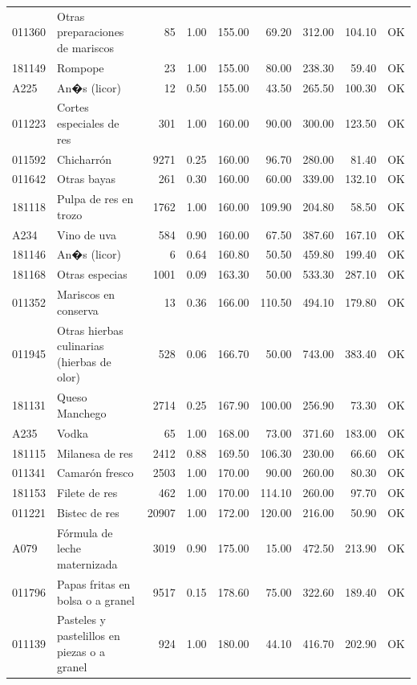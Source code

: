 \begin{table}[ht]
\begin{tabular}{llrrrrrrl}
  011360 & Otras preparaciones de mariscos &  85 & 1.00 & 155.00 & 69.20 & 312.00 & 104.10 & OK \\ 
  181149 & Rompope &  23 & 1.00 & 155.00 & 80.00 & 238.30 & 59.40 & OK \\ 
  A225 & An�s (licor) &  12 & 0.50 & 155.00 & 43.50 & 265.50 & 100.30 & OK \\ 
  011223 & Cortes especiales de res & 301 & 1.00 & 160.00 & 90.00 & 300.00 & 123.50 & OK \\ 
  011592 & Chicharrón & 9271 & 0.25 & 160.00 & 96.70 & 280.00 & 81.40 & OK \\ 
  011642 & Otras bayas & 261 & 0.30 & 160.00 & 60.00 & 339.00 & 132.10 & OK \\ 
  181118 & Pulpa de res en trozo & 1762 & 1.00 & 160.00 & 109.90 & 204.80 & 58.50 & OK \\ 
  A234 & Vino de uva & 584 & 0.90 & 160.00 & 67.50 & 387.60 & 167.10 & OK \\ 
  181146 & An�s (licor) &   6 & 0.64 & 160.80 & 50.50 & 459.80 & 199.40 & OK \\ 
  181168 & Otras especias & 1001 & 0.09 & 163.30 & 50.00 & 533.30 & 287.10 & OK \\ 
  011352 & Mariscos en conserva &  13 & 0.36 & 166.00 & 110.50 & 494.10 & 179.80 & OK \\ 
  011945 & Otras hierbas culinarias (hierbas de olor) & 528 & 0.06 & 166.70 & 50.00 & 743.00 & 383.40 & OK \\ 
  181131 & Queso Manchego & 2714 & 0.25 & 167.90 & 100.00 & 256.90 & 73.30 & OK \\ 
  A235 & Vodka &  65 & 1.00 & 168.00 & 73.00 & 371.60 & 183.00 & OK \\ 
  181115 & Milanesa de res & 2412 & 0.88 & 169.50 & 106.30 & 230.00 & 66.60 & OK \\ 
  011341 & Camarón fresco & 2503 & 1.00 & 170.00 & 90.00 & 260.00 & 80.30 & OK \\ 
  181153 & Filete de res & 462 & 1.00 & 170.00 & 114.10 & 260.00 & 97.70 & OK \\ 
  011221 & Bistec de res & 20907 & 1.00 & 172.00 & 120.00 & 216.00 & 50.90 & OK \\ 
  A079 & Fórmula de leche maternizada & 3019 & 0.90 & 175.00 & 15.00 & 472.50 & 213.90 & OK \\ 
  011796 & Papas fritas en bolsa o a granel & 9517 & 0.15 & 178.60 & 75.00 & 322.60 & 189.40 & OK \\ 
  011139 & Pasteles y pastelillos en piezas o a granel & 924 & 1.00 & 180.00 & 44.10 & 416.70 & 202.90 & OK \\ 

\end{tabular}
\end{table}
